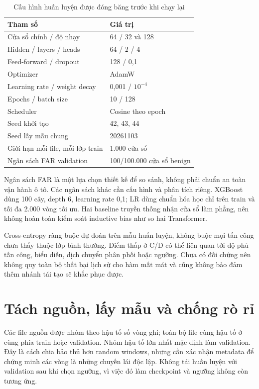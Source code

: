 \documentclass[12pt,a4paper,oneside,openany]{extbook}
\begin{document}
\begin{table}[htbp]\centering
\caption{Cấu hình huấn luyện được đóng băng trước khi chạy lại}\label{tab:config}
\begin{tabular}{ll}\toprule Tham số & Giá trị\\\midrule
Cửa sổ chính / độ nhạy & 64 / 32 và 128\\
Hidden / layers / heads & 64 / 2 / 4\\
Feed-forward / dropout & 128 / 0,1\\
Optimizer & AdamW\\
Learning rate / weight decay & 0,001 / $10^{-4}$\\
Epochs / batch size & 10 / 128\\
Scheduler & Cosine theo epoch\\
Seed khởi tạo & 42, 43, 44\\
Seed lấy mẫu chung & 20261103\\
Giới hạn mỗi file, mỗi lớp train & 1.000 cửa sổ\\
Ngân sách FAR validation & 100/100.000 cửa sổ benign\\\bottomrule\end{tabular}
\end{table}

Ngân sách FAR là một lựa chọn thiết kế để so sánh, không phải chuẩn an toàn vận hành ô tô. Các ngân sách khác cần cấu hình và phân tích riêng. XGBoost dùng 100 cây, depth 6, learning rate 0,1; LR dùng chuẩn hóa học chỉ trên train và tối đa 2.000 vòng tối ưu. Hai baseline truyền thống nhận cửa sổ làm phẳng, nên không hoàn toàn kiểm soát inductive bias như so hai Transformer.

Cross-entropy ràng buộc dự đoán trên mẫu huấn luyện, không buộc mọi tấn công chưa thấy thuộc lớp bình thường. Điểm thấp ở C/D có thể liên quan tới độ phủ tấn công, biểu diễn, dịch chuyển phân phối hoặc ngưỡng. Chưa có đối chứng nên không quy toàn bộ thất bại lịch sử cho hàm mất mát và cũng không bảo đảm thêm nhánh tái tạo sẽ khắc phục được.

\section{Tách nguồn, lấy mẫu và chống rò rỉ}
Các file nguồn được nhóm theo hậu tố số vòng ghi; toàn bộ file cùng hậu tố ở cùng phía train hoặc validation. Nhóm hậu tố lớn nhất mặc định làm validation. Đây là cách chia bảo thủ hơn random windows, nhưng cần xác nhận metadata để chứng minh các vòng là những chuyến lái độc lập. Không tái huấn luyện với validation sau khi chọn ngưỡng, vì việc đó làm checkpoint và ngưỡng không còn tương ứng.
\end{document}
